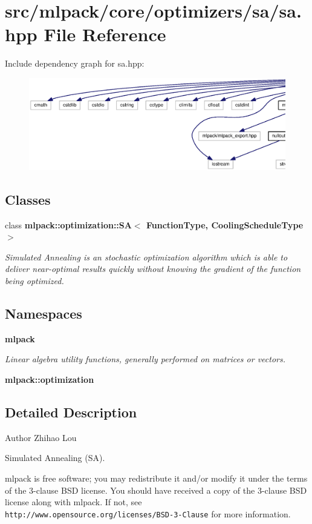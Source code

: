 \section{src/mlpack/core/optimizers/sa/sa.hpp File Reference}
\label{sa_8hpp}
Include dependency graph for sa.\+hpp\+:
\nopagebreak
\begin{figure}[H]
\begin{center}
\leavevmode
\includegraphics[width=350pt]{sa_8hpp__incl}
\end{center}
\end{figure}
\subsection*{Classes}
\begin{DoxyCompactItemize}
\item 
class {\bf mlpack\+::optimization\+::\+S\+A$<$ Function\+Type, Cooling\+Schedule\+Type $>$}
\begin{DoxyCompactList}\small\item\em Simulated Annealing is an stochastic optimization algorithm which is able to deliver near-\/optimal results quickly without knowing the gradient of the function being optimized. \end{DoxyCompactList}\end{DoxyCompactItemize}
\subsection*{Namespaces}
\begin{DoxyCompactItemize}
\item 
 {\bf mlpack}
\begin{DoxyCompactList}\small\item\em Linear algebra utility functions, generally performed on matrices or vectors. \end{DoxyCompactList}\item 
 {\bf mlpack\+::optimization}
\end{DoxyCompactItemize}


\subsection{Detailed Description}
\begin{DoxyAuthor}{Author}
Zhihao Lou
\end{DoxyAuthor}
Simulated Annealing (SA).

mlpack is free software; you may redistribute it and/or modify it under the terms of the 3-\/clause B\+SD license. You should have received a copy of the 3-\/clause B\+SD license along with mlpack. If not, see {\tt http\+://www.\+opensource.\+org/licenses/\+B\+S\+D-\/3-\/\+Clause} for more information. 